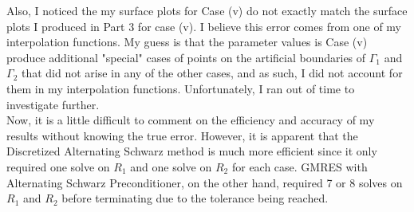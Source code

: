 \documentclass[12pt]{article}
\begin{document}
\noindent
Also, I noticed the my surface plots for Case (v) do not exactly match the surface plots I produced in Part 3 for case (v).  I believe this error comes from one of my interpolation functions.  My guess is that the parameter values is Case (v) produce additional "special" cases of points on the artificial boundaries of $\Gamma_1$ and $\Gamma_2$ that did not arise in any of the other cases, and as such, I did not account for them in my interpolation functions.  Unfortunately, I ran out of time to investigate further.\\ 

\noindent
Now, it is a little difficult to comment on the efficiency and accuracy of my results without knowing the true error.  However, it is apparent that the Discretized Alternating Schwarz method is much more efficient since it only required one solve on $R_1$ and one solve on $R_2$ for each case.  GMRES with Alternating Schwarz Preconditioner, on the other hand, required 7 or 8 solves on $R_1$ and $R_2$ before terminating due to the tolerance being reached.
\end{document}
